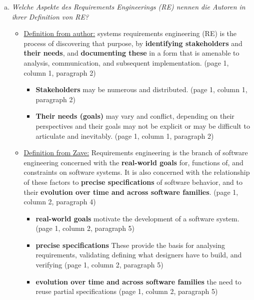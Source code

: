 \begin{enumerate}[a)]

    \item {\itshape Welche Aspekte des Requirements Engineerings (RE) nennen die Autoren in ihrer Definition von RE?}
    \begin{itemize}
        \item \underline{Definition from author:} systems requirements engineering (RE) is the process of discovering that purpose, by \textbf{identifying stakeholders} and \textbf{their needs}, and \textbf{documenting these} in a form that is amenable to analysis, communication, and subsequent implementation. (page 1, column 1, paragraph 2)
        \begin{itemize}
            \item \textbf{Stakeholders} may be numerous and distributed. (page 1, column 1, paragraph 2)
            \item \textbf{Their needs (goals)} may vary and conflict, depending on their perspectives and their goals may not be explicit or may be difficult to articulate and inevitably. (page 1, column 1, paragraph 2)
        \end{itemize}
        
        \item \underline{Definition from Zave:} Requirements engineering is the branch of software engineering  concerned  with  the  \textbf{real-world  goals}  for, functions  of,  and  constraints  on  software  systems.  It is  also  concerned  with  the  relationship  of  these factors to \textbf{precise specifications} of software behavior, and to their \textbf{evolution over time and across software families}. (page 1, column 2, paragraph 4)
        \begin{itemize}
            \item \textbf{real-world goals} motivate the development of a software system. (page 1, column 2, paragraph 5)
            \item \textbf{precise specifications} These provide the basis for analysing  requirements,  validating defining  what  designers have to build, and verifying (page 1, column 2, paragraph 5)
            \item \textbf{evolution  over  time  and  across  software families} the need to reuse partial  specifications (page 1, column 2, paragraph 5)
        \end{itemize}
    \end{itemize}
    

\end{enumerate}

